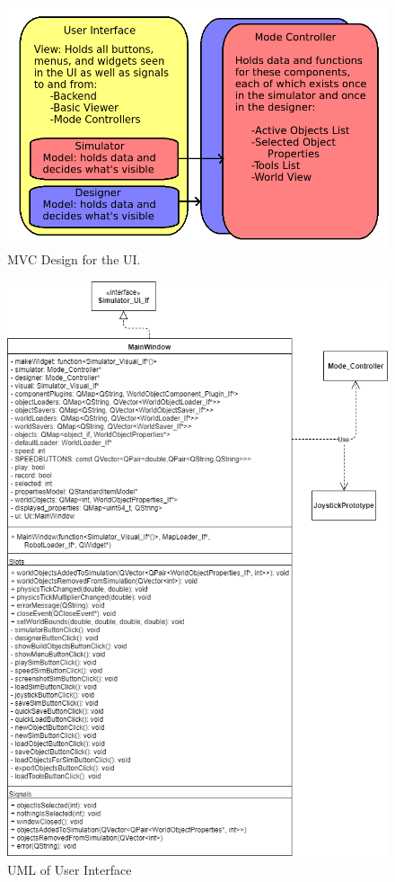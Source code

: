  \begin{figure}
 	\begin{center}
 	\includegraphics[width=\textwidth]{./images_design/ui_architecture.png}
 	\caption{MVC Design for the UI.\label{uml:dataflow_ui}}
 	\end{center}
 \end{figure} 
 
 \begin{figure}
 	\begin{center}
 	\includegraphics[scale=0.5]{./images_design/uml/MainWindow}
 	\caption{UML of User Interface\label{uml:mainwin}}
 	\end{center}
 \end{figure}

